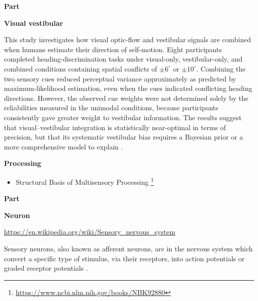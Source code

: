 \documentclass{book}
\providecommand{\ProjectDeepHeading}[2]{%
    \par\medskip\noindent\textbf{#2}\par\smallskip
}
\providecommand{\seeherefooter}[1]{\footnote{\url{#1}}}
\begin{document}
\ProjectDeepHeading{4}{Part}

\ProjectDeepHeading{5}{Visual vestibular}


This study investigates how visual optic-flow and vestibular signals are combined when humans estimate their direction of self-motion.
    Eight participants completed heading-discrimination tasks under visual-only, vestibular-only, and combined conditions containing spatial conflicts of $\pm 6^{\circ}$ or $\pm 10^{\circ}$.
    Combining the two sensory cues reduced perceptual variance approximately as predicted by maximum-likelihood estimation, even when the cues indicated conflicting heading directions.
    However, the observed cue weights were not determined solely by the reliabilities measured in the unimodal conditions, because participants consistently gave greater weight to vestibular information.
    The results suggest that visual--vestibular integration is statistically near-optimal in terms of precision, but that its systematic vestibular bias requires a Bayesian prior or a more comprehensive model to explain \cite{butler-2010-bayesian-integration-of-visual-and-vestibular-signals-for-heading}.

\ProjectDeepHeading{3}{Processing}


\begin{itemize}
        \item Structural Basis of Multisensory Processing \seeherefooter{https://www.ncbi.nlm.nih.gov/books/NBK92880}
    \end{itemize}

\ProjectDeepHeading{2}{Part}

\ProjectDeepHeading{3}{Neuron}


\url{https://en.wikipedia.org/wiki/Sensory_nervous_system}
    
    



    
    
    
    Sensory neurons, also known as afferent neurons, are in the nervous system which convert a specific type of stimulus, via their receptors, into action potentials or graded receptor potentials .
\end{document}
